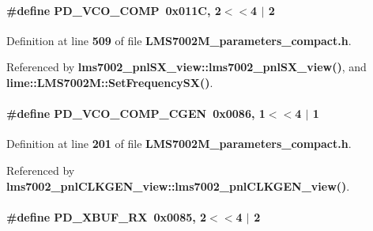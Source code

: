 \paragraph[{P\+D\+\_\+\+V\+C\+O\+\_\+\+C\+O\+MP}]{\setlength{\rightskip}{0pt plus 5cm}\#define P\+D\+\_\+\+V\+C\+O\+\_\+\+C\+O\+MP~0x011\+C, 2$<$$<$4 $\vert$  2}\label{LMS7002M__parameters__compact_8h_ac09f89d3e959b69df03f7e25c88b19fd}


Definition at line {\bf 509} of file {\bf L\+M\+S7002\+M\+\_\+parameters\+\_\+compact.\+h}.



Referenced by {\bf lms7002\+\_\+pnl\+S\+X\+\_\+view\+::lms7002\+\_\+pnl\+S\+X\+\_\+view()}, and {\bf lime\+::\+L\+M\+S7002\+M\+::\+Set\+Frequency\+S\+X()}.

\paragraph[{P\+D\+\_\+\+V\+C\+O\+\_\+\+C\+O\+M\+P\+\_\+\+C\+G\+EN}]{\setlength{\rightskip}{0pt plus 5cm}\#define P\+D\+\_\+\+V\+C\+O\+\_\+\+C\+O\+M\+P\+\_\+\+C\+G\+EN~0x0086, 1$<$$<$4 $\vert$  1}\label{LMS7002M__parameters__compact_8h_a2414115609be659f1e8461a3f06362aa}


Definition at line {\bf 201} of file {\bf L\+M\+S7002\+M\+\_\+parameters\+\_\+compact.\+h}.



Referenced by {\bf lms7002\+\_\+pnl\+C\+L\+K\+G\+E\+N\+\_\+view\+::lms7002\+\_\+pnl\+C\+L\+K\+G\+E\+N\+\_\+view()}.

\paragraph[{P\+D\+\_\+\+X\+B\+U\+F\+\_\+\+RX}]{\setlength{\rightskip}{0pt plus 5cm}\#define P\+D\+\_\+\+X\+B\+U\+F\+\_\+\+RX~0x0085, 2$<$$<$4 $\vert$  2}\label{LMS7002M__parameters__compact_8h_a55f1682ef624b454a6fac61e9bbd21df}


